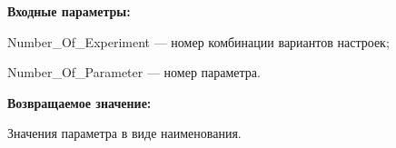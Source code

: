 \textbf{Входные параметры:}

Number\_Of\_Experiment --- номер комбинации вариантов настроек;
 
Number\_Of\_Parameter --- номер параметра.

\textbf{Возвращаемое значение:}

Значения параметра в виде наименования.